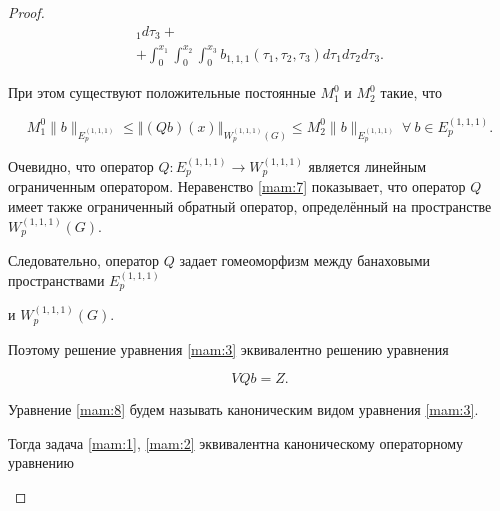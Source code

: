 \begin{proof}
\begin{multline*}
_1 d\tau

_3 + 

\\

+

\int_{0}^{x_1 }\int_{0}^{x_2 }\int_{0}^{x_3 }b_{1, 1, 1}(\tau

_1 ,\tau _2 ,\tau _3 )d\tau _1 d\tau _2 d\tau _3 .

\end{multline*}



При этом существуют положительные постоянные $M_1 ^{0}$ и $M_2 ^{0}$ такие, что

\begin{equation}

\label{mam:7}

M_1 ^{0}\| b \| _{E_{p}^{(1, 1, 1) }}\leq

\left\Vert ( Qb ) (x)\right\Vert _{W_{p}^{(1, 1, 1)}(G)}%



\leq

M_2 ^{0}\| b \| _{E_{p}^{(1, 1, 1) }} \ \forall \ b\in E_{p}^{(1, 1, 1) }.

\end{equation}



Очевидно, что оператор $Q:E_{p}^{(1, 1, 1) }\rightarrow W_{p}^{(1, 1, 1) }$ является линейным ограниченным оператором. Неравенство \eqref{mam:7} показывает, что оператор $Q$ имеет также ограниченный обратный оператор, определённый на пространстве $W_{p}^{(1, 1, 1) }(G)$.

Следовательно, оператор $Q$ задает гомеоморфизм между банаховыми пространствами $E_{p}^{(1, 1, 1) }$

и $W_{p}^{(1, 1, 1) }(G)$.

Поэтому решение уравнения \eqref{mam:3} эквивалентно решению уравнения

\begin{equation}

\label{mam:8}

VQb=Z.

\end{equation}

Уравнение \eqref{mam:8} будем называть каноническим видом уравнения \eqref{mam:3}. 

Тогда задача \eqref{mam:1}, \eqref{mam:2} эквивалентна каноническому операторному уравнению

\begin{equation}


\end{equation}
\end{proof}
